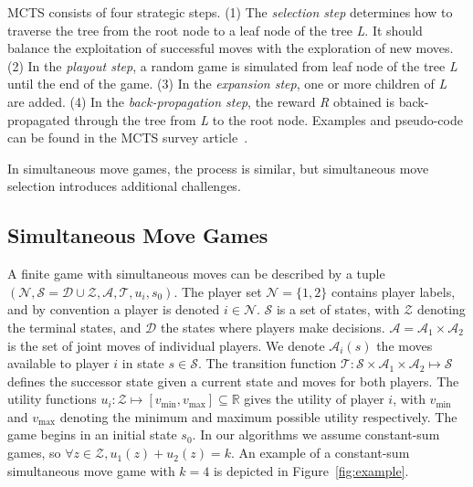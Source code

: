 \documentclass[conference]{IEEEtran}
\newcommand{\cA}{\mathcal{A}}
\newcommand{\cD}{\mathcal{D}}
\newcommand{\cN}{\mathcal{N}}
\newcommand{\cS}{\mathcal{S}}
\newcommand{\cT}{\mathcal{T}}
\newcommand{\cZ}{\mathcal{Z}}
\begin{document}
MCTS consists of four strategic steps. (1) The \textit{selection step} determines how to traverse the tree from the 
root node to a leaf node of the tree \textit{L}. It should balance the exploitation of successful moves with the 
exploration of new moves. (2) In the \textit{playout step}, a random game is simulated from leaf node of the tree 
\textit{L} until the end of the game.  (3) In the \textit{expansion step}, one or more children of \textit{L} are 
added. (4) In the \textit{back-propagation step}, the reward \textit{R} obtained is back-propagated through the tree 
from \textit{L} to the root node. Examples and pseudo-code can be found in the MCTS survey article~\cite{Browne12MCTSSurvey}.

In simultaneous move games, the process is similar, but simultaneous move selection introduces additional challenges.

\subsection{Simultaneous Move Games}

A finite game with simultaneous moves can be described by a tuple 
$(\cN, \cS = \cD \cup \cZ, \cA, \cT, u_i, s_0)$. The player set $\cN = \{ 1, 2 \}$ contains player 
labels, and by convention a player is denoted $i \in \cN$.
$\cS$ is a set of states, with $\cZ$ denoting the terminal states, and $\cD$ the states where players make decisions.
$\cA = \cA_1 \times \cA_2$ is the set of joint moves of individual players. We denote $\cA_i(s)$ the moves available 
to player $i$ in state $s \in \cS$. The 
transition function $\cT : \cS \times \cA_1 \times \cA_2 \mapsto \cS$ defines the successor state given a current 
state and moves for both players. The utility functions 
$u_i : \cZ \mapsto [v_{\min}, v_{\max}] \subseteq \mathbb{R}$ gives the utility of player $i$, with 
$v_{\min}$ and $v_{\max}$ denoting the minimum and maximum possible utility respectively. 
The game begins in an initial state $s_0$. In our algorithms we assume constant-sum games, so
$\forall z \in \cZ, u_1(z) + u_2(z) = k$. 
An example of a constant-sum simultaneous move game with $k=4$ is depicted in Figure~\ref{fig:example}. 
\end{document}

